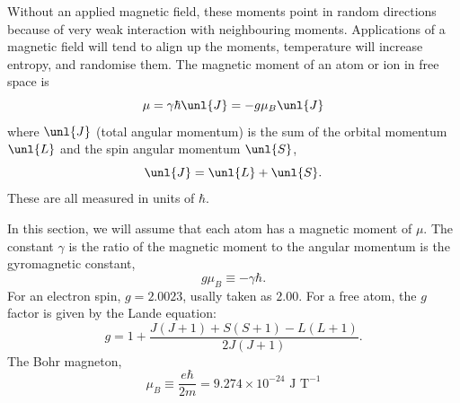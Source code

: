 \documentclass[a4paper, 11pt, normalem]{report}
\begin{document}
Without an applied magnetic field, these moments point in random directions because of very weak interaction with neighbouring moments.
Applications of a magnetic field will tend to align up the moments, temperature will increase entropy, and randomise them. 
The magnetic moment of an atom or ion in free space is 
\begin{equation}
    \mu = \gamma\hbar\unl{J} = -g\mu_B\unl{J}
\end{equation}
where $\unl{J}$ (total angular momentum) is the sum of the orbital momentum $\unl{L}$ and the spin angular momentum $\unl{S}$,
\begin{equation}
    \unl{J} = \unl{L} + \unl{S}.
\end{equation}
These are all measured in units of $\hbar$.

In this section, we will assume that each atom has a magnetic moment of $\mu$.
The constant $\gamma$ is the ratio of the magnetic moment to the angular momentum is the gyromagnetic constant,
\begin{equation}
    g\mu_B \equiv -\gamma\hbar.
\end{equation}
For an electron spin, $g=2.0023$, usally taken as $2.00$.
For a free atom, the $g$ factor is given by the Lande equation:
\begin{equation}
    g = 1 + \frac{J(J+1) + S(S+1) - L(L+1)}{2J(J+1)}.
\end{equation}
The Bohr magneton, 
\begin{equation}
    \mu_B \equiv \frac{e\hbar}{2m} = 9.274\times10^{-24}\text{ J T}^{-1}
\end{equation}
\end{document}
